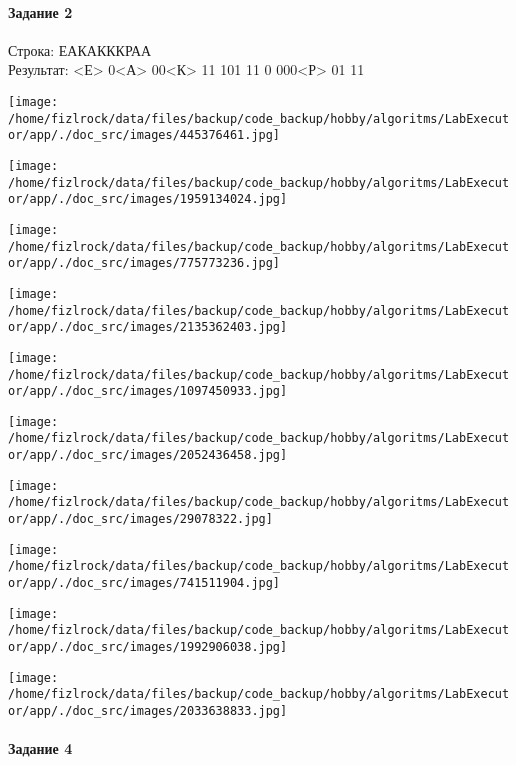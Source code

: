 \documentclass[a4paper, 12pt]{article}
\begin{document}
\paragraph{Задание 2}

Строка: 
ЕАКАКККРАА\\
Результат: <Е> 0<А> 00<К> 11 101 11 0 000<Р> 01 11

\texttt{[image: /home/fizlrock/data/files/backup/code\_backup/hobby/algoritms/LabExecutor/app/./doc\_src/images/445376461.jpg]}

\texttt{[image: /home/fizlrock/data/files/backup/code\_backup/hobby/algoritms/LabExecutor/app/./doc\_src/images/1959134024.jpg]}

\texttt{[image: /home/fizlrock/data/files/backup/code\_backup/hobby/algoritms/LabExecutor/app/./doc\_src/images/775773236.jpg]}

\texttt{[image: /home/fizlrock/data/files/backup/code\_backup/hobby/algoritms/LabExecutor/app/./doc\_src/images/2135362403.jpg]}

\texttt{[image: /home/fizlrock/data/files/backup/code\_backup/hobby/algoritms/LabExecutor/app/./doc\_src/images/1097450933.jpg]}

\texttt{[image: /home/fizlrock/data/files/backup/code\_backup/hobby/algoritms/LabExecutor/app/./doc\_src/images/2052436458.jpg]}

\texttt{[image: /home/fizlrock/data/files/backup/code\_backup/hobby/algoritms/LabExecutor/app/./doc\_src/images/29078322.jpg]}

\texttt{[image: /home/fizlrock/data/files/backup/code\_backup/hobby/algoritms/LabExecutor/app/./doc\_src/images/741511904.jpg]}

\texttt{[image: /home/fizlrock/data/files/backup/code\_backup/hobby/algoritms/LabExecutor/app/./doc\_src/images/1992906038.jpg]}

\texttt{[image: /home/fizlrock/data/files/backup/code\_backup/hobby/algoritms/LabExecutor/app/./doc\_src/images/2033638833.jpg]}
\pagebreak
\paragraph{Задание 4}
\end{document}
